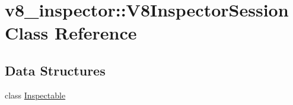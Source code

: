 \hypertarget{classv8__inspector_1_1V8InspectorSession}{}\section{v8\+\_\+inspector\+:\+:V8\+Inspector\+Session Class Reference}
\label{classv8__inspector_1_1V8InspectorSession}
\subsection*{Data Structures}
\begin{DoxyCompactItemize}
\item 
class \mbox{\hyperlink{classv8__inspector_1_1V8InspectorSession_1_1Inspectable}{Inspectable}}
\end{DoxyCompactItemize}
